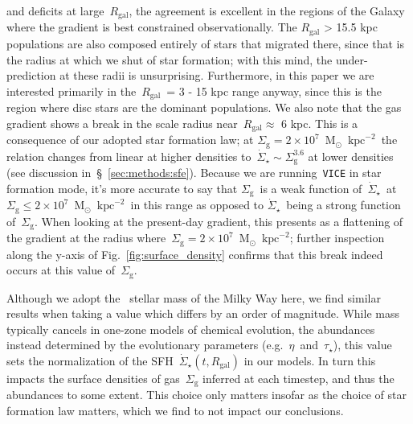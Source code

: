 \documentclass[fleqn, usenatbib]{mnras}
\newcommand{\msun}{\ensuremath{\text{M}_\odot}}
\newcommand{\persqkpc}{\ensuremath{\text{kpc}^{-2}}}
\begin{document}
and deficits at large~$R_\text{gal}$, the agreement is excellent in the regions 
of the Galaxy where the gradient is best constrained observationally. The 
$R_\text{gal}$ > 15.5 kpc populations are also composed entirely of stars that 
migrated there, since that is the radius at which we shut of star formation; 
with this mind, the under-prediction at these radii is unsurprising. 
Furthermore, in this paper we are interested primarily in the~$R_\text{gal}$~= 
3 - 15 kpc range anyway, since this is the region where disc stars are the 
dominant populations. We also note that the gas gradient
shows a break in the scale radius near~$R_\text{gal} \approx$ 
6 kpc. This is a consequence of our adopted star formation law; at 
$\Sigma_\text{g} = 2\times10^7$~\msun~\persqkpc~the relation changes from 
linear at higher densities to~$\dot{\Sigma}_\star \sim \Sigma_\text{g}^{3.6}$ 
at lower densities (see discussion in~\S~\ref{sec:methods:sfe}). Because we are 
running~\texttt{VICE} in star formation mode, it's more accurate to say that 
$\Sigma_\text{g}$~is a weak function of~$\dot{\Sigma}_\star$~at 
$\Sigma_\text{g} \leq 2\times10^7$~\msun~\persqkpc~in this range as opposed to 
$\dot{\Sigma}_\star$~being a strong function of~$\Sigma_\text{g}$. When looking 
at the present-day gradient, this presents as a flattening of the gradient at 
the radius where~$\Sigma_\text{g} = 2\times10^7$~\msun~\persqkpc; further 
inspection along the y-axis of Fig.~\ref{fig:surface_density} confirms that 
this break indeed occurs at this value of~$\Sigma_\text{g}$. 
\par 
Although we adopt the~\citet{Licquia2015} stellar mass of the Milky Way here, 
we find similar results when taking a value which differs by an order of 
magnitude. While mass typically cancels in one-zone models of chemical 
evolution, the abundances instead determined by the evolutionary parameters 
(e.g.~$\eta$~and~$\tau_\star$), this value sets the normalization of the 
SFH~$\dot{\Sigma}_\star(t, R_\text{gal})$ in our models. In turn this impacts 
the surface densities of gas~$\Sigma_\text{g}$ inferred at each timestep, and 
thus the abundances to some extent. This choice only matters insofar as the 
choice of star formation law matters, which we find to not impact our 
conclusions. 
\end{document}
